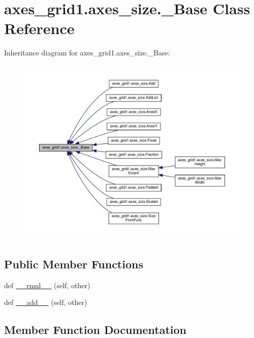 \hypertarget{classaxes__grid1_1_1axes__size_1_1__Base}{}\section{axes\+\_\+grid1.\+axes\+\_\+size.\+\_\+\+Base Class Reference}
\label{classaxes__grid1_1_1axes__size_1_1__Base}


Inheritance diagram for axes\+\_\+grid1.\+axes\+\_\+size.\+\_\+\+Base\+:
\nopagebreak
\begin{figure}[H]
\begin{center}
\leavevmode
\includegraphics[width=350pt]{classaxes__grid1_1_1axes__size_1_1__Base__inherit__graph}
\end{center}
\end{figure}
\subsection*{Public Member Functions}
\begin{DoxyCompactItemize}
\item 
def \hyperlink{classaxes__grid1_1_1axes__size_1_1__Base_a6fa8ca5ff6b309e56698845eebd79633}{\+\_\+\+\_\+rmul\+\_\+\+\_\+} (self, other)
\item 
def \hyperlink{classaxes__grid1_1_1axes__size_1_1__Base_a4882c4f21d50c01426b77bd416fe33e3}{\+\_\+\+\_\+add\+\_\+\+\_\+} (self, other)
\end{DoxyCompactItemize}


\subsection{Member Function Documentation}
\mbox{\label{classaxes__grid1_1_1axes__size_1_1__Base_a4882c4f21d50c01426b77bd416fe33e3}} 
